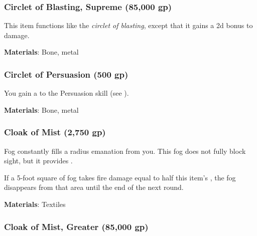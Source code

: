 \lowercase{\hypertarget{item:Circlet of Blasting, Supreme}{}}\label{item:Circlet of Blasting, Supreme}
\hypertarget{item:Circlet of Blasting, Supreme}{\subsubsection{Circlet of Blasting, Supreme\hfill{} (85,000 gp)}}

This item functions like the \textit{circlet of blasting}, except that it gains a \plus2d bonus to damage.



\vspace{0.25em}
\textbf{Materials}: Bone, metal


\lowercase{\hypertarget{item:Circlet of Persuasion}{}}\label{item:Circlet of Persuasion}
\hypertarget{item:Circlet of Persuasion}{\subsubsection{Circlet of Persuasion\hfill{} (500 gp)}}

You gain a   to the Persuasion skill (see ).



\vspace{0.25em}
\textbf{Materials}: Bone, metal


\lowercase{\hypertarget{item:Cloak of Mist}{}}\label{item:Cloak of Mist}
\hypertarget{item:Cloak of Mist}{\subsubsection{Cloak of Mist\hfill{} (2,750 gp)}}

Fog constantly fills a \areamed radius emanation from you.
This fog does not fully block sight, but it provides \concealment.

If a 5-foot square of fog takes fire damage equal to half this item's , the fog disappears from that area until the end of the next round.



\vspace{0.25em}
\textbf{Materials}: Textiles


\lowercase{\hypertarget{item:Cloak of Mist, Greater}{}}\label{item:Cloak of Mist, Greater}
\hypertarget{item:Cloak of Mist, Greater}{\subsubsection{Cloak of Mist, Greater\hfill{} (85,000 gp)}}

